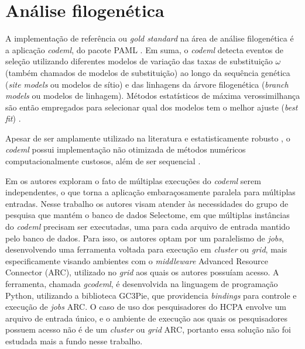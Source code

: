 \documentclass[cic,tc]{iiufrgs}
\begin{document}
\section{Análise filogenética}
\label{sec:filoant}

A implementação de referência ou \textit{gold standard} na área de análise
filogenética é a aplicação \textit{codeml}, do pacote PAML \cite{valle2014optimization}.
Em suma, o \textit{codeml} detecta eventos de seleção utilizando diferentes
modelos de variação das taxas de substituição $\omega$ (também chamados de
modelos de substituição) ao longo da sequência genética (\textit{site models}
ou modelos de sítio) e das linhagens da árvore filogenética (\textit{branch
models} ou modelos de linhagem). Métodos estatísticos de máxima verossimilhança
são então empregados para selecionar qual dos modelos tem o melhor ajuste
(\textit{best fit}) \cite{yang2007paml}. 

Apesar de ser amplamente utilizado na literatura e estatisticamente robusto
\cite{maldonado2016lmap}, o \textit{codeml} possui implementação não otimizada de métodos
numéricos computacionalmente custosos, além de ser sequencial
\cite{yang2020paml}.

Em \cite{moretti2012gcodeml} os autores exploram o fato de múltiplas execuções
do \textit{codeml} serem independentes, o que torna a aplicação embaraçosamente
paralela para múltiplas entradas. Nesse trabalho os autores visam atender às
necessidades do grupo de pesquisa que mantém o banco de dados Selectome, em
que múltiplas instâncias do \textit{codeml} precisam ser executadas, uma para cada
arquivo de entrada mantido pelo banco de dados. Para isso, os autores optam
por um paralelismo de \textit{jobs}, desenvolvendo uma ferramenta voltada
para execução em \textit{cluster} ou \textit{grid}, mais especificamente
visando ambientes com o \textit{middleware} Advanced Resource Connector (ARC),
utilizado no \textit{grid} aos quais os autores possuíam acesso. A ferramenta,
chamada \textit{gcodeml}, é desenvolvida na linguagem de programação Python, utilizando
a biblioteca GC3Pie, que providencia \textit{bindings} para controle e execução
de \textit{jobs} ARC. O caso de uso dos pesquisadores do HCPA envolve um
arquivo de entrada único, e o ambiente de execução aos quais os pesquisadores
possuem acesso não é de um \textit{cluster} ou \textit{grid} ARC, portanto essa
solução não foi estudada mais a fundo nesse trabalho.
\end{document}
